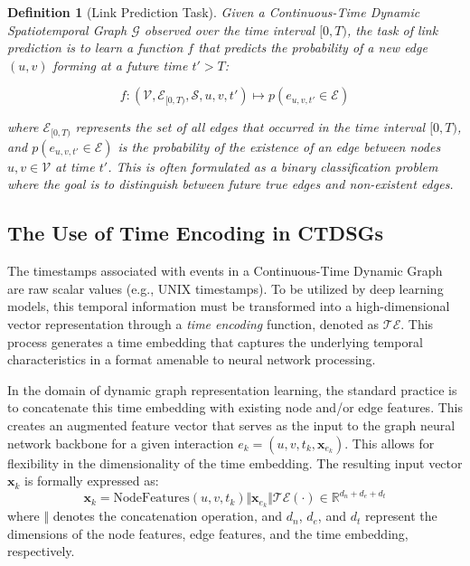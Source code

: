 \documentclass{article}
\newtheorem{definition}{Definition}
\begin{document}
\begin{definition}[Link Prediction Task]
Given a Continuous-Time Dynamic Spatiotemporal Graph $\mathcal{G}$ observed over the time interval $[0, T)$, the task of link prediction is to learn a function $f$ that predicts the probability of a new edge $(u, v)$ forming at a future time $t' > T$:

$$ f: (\mathcal{V}, \mathcal{E}_{[0, T)}, \mathcal{S}, u, v, t') \mapsto p(e_{u,v,t'} \in \mathcal{E}) $$

where $\mathcal{E}_{[0, T)}$ represents the set of all edges that occurred in the time interval $[0, T)$, and $p(e_{u,v,t'} \in \mathcal{E})$ is the probability of the existence of an edge between nodes $u, v \in \mathcal{V}$ at time $t'$. This is often formulated as a binary classification problem where the goal is to distinguish between future true edges and non-existent edges.
\end{definition}
\subsection{The Use of Time Encoding in CTDSGs}

The timestamps associated with events in a Continuous-Time Dynamic Graph are raw scalar values (e.g., UNIX timestamps). To be utilized by deep learning models, this temporal information must be transformed into a high-dimensional vector representation through a \textit{time encoding} function, denoted as $\mathcal{TE}$. This process generates a time embedding that captures the underlying temporal characteristics in a format amenable to neural network processing.

In the domain of dynamic graph representation learning, the standard practice is to concatenate this time embedding with existing node and/or edge features. This creates an augmented feature vector that serves as the input to the graph neural network backbone for a given interaction $e_k = (u, v, t_k, \mathbf{x}_{e_k})$. This allows for flexibility in the dimensionality of the time embedding. The resulting input vector $\mathbf{x}_k$ is formally expressed as:
\begin{equation}
\mathbf{x}_k = \text{NodeFeatures}(u, v, t_k) \Vert \mathbf{x}_{e_k} \Vert \mathcal{TE}(\cdot) \in \mathbb{R}^{d_n + d_e + d_t}
\end{equation}
where $\Vert$ denotes the concatenation operation, and $d_n$, $d_e$, and $d_t$ represent the dimensions of the node features, edge features, and the time embedding, respectively.
\end{document}
